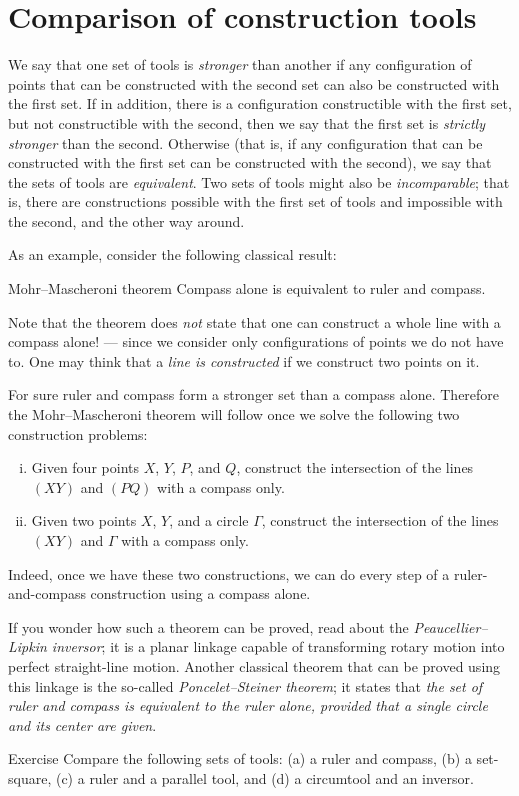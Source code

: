 \section{Comparison of construction tools}

We say that one set of tools is {}\emph{stronger} than another if any configuration of points that can be constructed with the second set can also be constructed with the first set.
If in addition, there is a configuration constructible with the first set, but not constructible with the second, then we say that the first set is {}\emph{strictly stronger} than the second.
Otherwise (that is, if any configuration that can be constructed with the first set can be constructed with the second), we say that the sets of tools are {}\emph{equivalent}. 
Two sets of tools might also be {}\emph{incomparable};
that is, there are constructions possible with the first set of tools and impossible with the second, and the other way around.

As an example, consider the following classical result:

\begin{thm}{Mohr--Mascheroni theorem}
Compass alone is equivalent to ruler and compass.
\end{thm}

Note that the theorem does \textit{not} state that one can construct a whole line with a compass alone!
--- since we consider only configurations of points we do not have to.
One may think that a \textit{line is constructed} if we construct two points on it.

For sure ruler and compass form a stronger set than a compass alone.
Therefore the Mohr--Mascheroni theorem will follow once we solve the following two construction problems:
\begin{enumerate}[(i)]
\item Given four points $X$, $Y$, $P$, and $Q$, construct the intersection of the lines $(XY)$ and $(PQ)$ with  a compass only.
\item Given two points $X$, $Y$, and a circle $\Gamma$, construct the intersection of the lines $(XY)$ and $\Gamma$ with a compass only.
\end{enumerate}
Indeed, once we have these two constructions, we can do every step of a ruler-and-compass construction using a compass alone.

If you wonder how such a theorem can be proved, read about the \textit{Peaucellier--Lipkin inversor};
it is a planar linkage capable of transforming rotary motion into perfect straight-line motion.
Another classical theorem that can be proved using this linkage is the so-called \emph{Poncelet--Steiner theorem};
it states that \textit{the set of ruler and compass is equivalent to the ruler alone, provided that a single circle and its center are given}.

\begin{thm}{Exercise}\label{ex:comparison}
Compare the following sets of tools:
(a) a ruler and compass, 
(b) a set-square, 
(c) a ruler and a parallel tool,
and
(d) a circumtool and an inversor.
\end{thm}


